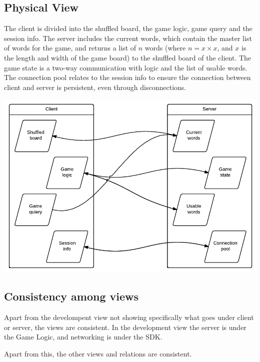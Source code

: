 \subsection{Physical View}
The client is divided into the shuffled board, the game logic, game query and
the session info. The server includes the current words, which contain the
master list of words for the game, and returns a list of $n$ words (where
$n = x\times x$, and $x$ is the length and width of the game board) to the
shuffled board of the client. The game state is a two-way communication with
logic and the list of usable words. The connection pool relates to the session
info to ensure the connection between client and server is persistent, even
through disconnections.
\begin{center}
\includegraphics[clip=true, width=0.9 \textwidth]{assets/PhysicalView.pdf}
\label{ref:gantt}
\end{center}

\subsection{Consistency among views} 
\label{sec:consistencyamongviews}

Apart from the develompent view not showing specifically what goes under client
or server, the views are consistent. In the development view the server is
under the Game Logic, and networking is under the SDK\@.

Apart from this, the other views and relations are consistent.
